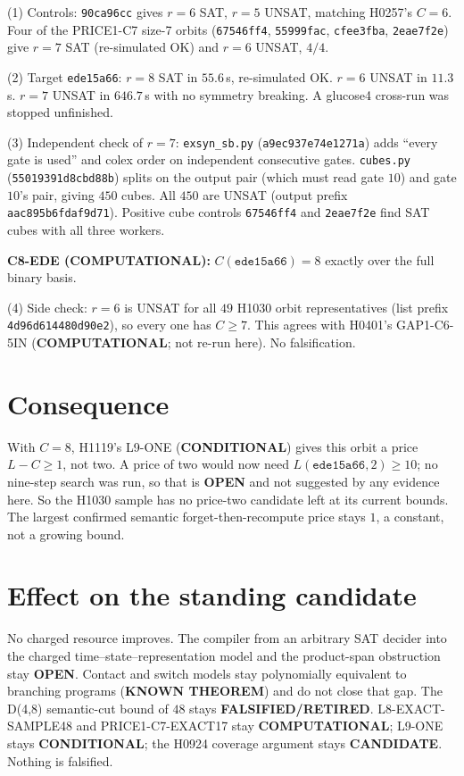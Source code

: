 \documentclass[11pt]{article}
\begin{document}
(1) Controls: \texttt{90ca96cc} gives $r=6$ SAT, $r=5$ UNSAT, matching H0257's $C=6$. Four of the PRICE1-C7 size-7 orbits (\texttt{67546ff4}, \texttt{55999fac}, \texttt{cfee3fba}, \texttt{2eae7f2e}) give $r=7$ SAT (re-simulated OK) and $r=6$ UNSAT, $4/4$.

(2) Target \texttt{ede15a66}: $r=8$ SAT in $55.6$\,s, re-simulated OK. $r=6$ UNSAT in $11.3$\,s. $r=7$ UNSAT in $646.7$\,s with no symmetry breaking. A glucose4 cross-run was stopped unfinished.

(3) Independent check of $r=7$: \texttt{exsyn\_sb.py} (\texttt{a9ec937e74e1271a}) adds ``every gate is used'' and colex order on independent consecutive gates. \texttt{cubes.py} (\texttt{55019391d8cbd88b}) splits on the output pair (which must read gate $10$) and gate $10$'s pair, giving $450$ cubes. All $450$ are UNSAT (output prefix \texttt{aac895b6fdaf9d71}). Positive cube controls \texttt{67546ff4} and \texttt{2eae7f2e} find SAT cubes with all three workers.

\textbf{C8-EDE (COMPUTATIONAL):} $C(\texttt{ede15a66})=8$ exactly over the full binary basis.

(4) Side check: $r=6$ is UNSAT for all $49$ H1030 orbit representatives (list prefix \texttt{4d96d614480d90e2}), so every one has $C\ge7$. This agrees with H0401's GAP1-C6-5IN (\textbf{COMPUTATIONAL}; not re-run here). No falsification.

\section*{Consequence}
With $C=8$, H1119's L9-ONE (\textbf{CONDITIONAL}) gives this orbit a price $L-C\ge1$, not two. A price of two would now need $L(\texttt{ede15a66},2)\ge10$; no nine-step search was run, so that is \textbf{OPEN} and not suggested by any evidence here. So the H1030 sample has no price-two candidate left at its current bounds. The largest confirmed semantic forget-then-recompute price stays $1$, a constant, not a growing bound.

\section*{Effect on the standing candidate}
No charged resource improves. The compiler from an arbitrary SAT decider into the charged time--state--representation model and the product-span obstruction stay \textbf{OPEN}. Contact and switch models stay polynomially equivalent to branching programs (\textbf{KNOWN THEOREM}) and do not close that gap. The D(4,8) semantic-cut bound of $48$ stays \textbf{FALSIFIED/RETIRED}. L8-EXACT-SAMPLE48 and PRICE1-C7-EXACT17 stay \textbf{COMPUTATIONAL}; L9-ONE stays \textbf{CONDITIONAL}; the H0924 coverage argument stays \textbf{CANDIDATE}. Nothing is falsified.
\end{document}

